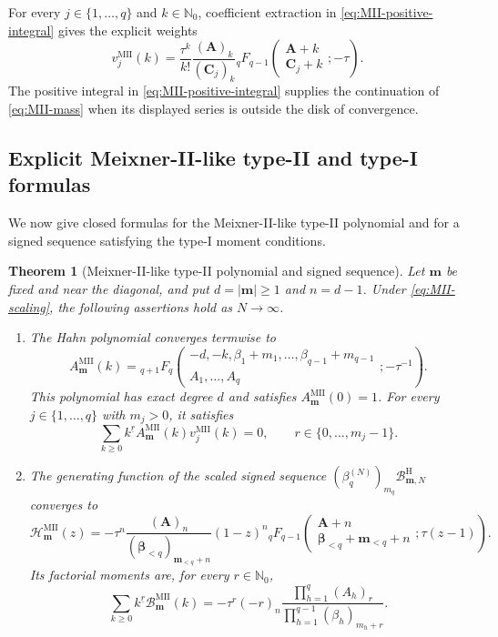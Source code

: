 \documentclass[10pt]{amsart}
\newcommand{\Nzero}{\mathbb N_0}
\newcommand{\A}{\boldsymbol A}
\newcommand{\bbeta}{\boldsymbol\beta}
\newcommand{\mm}{\boldsymbol m}
\newcommand{\abs}[1]{\lvert#1\rvert}
\newcommand{\fall}[2]{#1^{\underline{#2}}}
\newcommand{\pFq}[5]{{}_{#1}F_{#2}\!\left(\begin{matrix}#3\\#4\end{matrix};#5\right)}
\theoremstyle{plain}
\newtheorem{theorem}{Theorem}[section]
\theoremstyle{definition}
\theoremstyle{remark}
\begin{document}
For every \(j\in\{1,\ldots,q\}\) and \(k\in\Nzero\), coefficient
extraction in \eqref{eq:MII-positive-integral} gives the explicit weights
\begin{equation}
 v_j^{\mathrm{MII}}(k)
 =\frac{\tau^k}{k!}
 \frac{(\A)_k}{(\boldsymbol C_j)_k}
 \pFq{q}{q-1}{\A+k}{\boldsymbol C_j+k}{-\tau}.
 \label{eq:MII-mass}
\end{equation}
The positive integral in \eqref{eq:MII-positive-integral} supplies the
continuation of \eqref{eq:MII-mass} when its displayed series is outside
the disk of convergence.

\subsection{Explicit Meixner-II-like type-II and type-I formulas}

We now give closed formulas for the Meixner-II-like type-II polynomial and
for a signed sequence satisfying the type-I moment conditions.

\begin{theorem}[Meixner-II-like type-II polynomial and signed sequence]
\label{thm:MII-forms}
Let \(\mm\) be fixed and near the diagonal, and put
\(d=\abs\mm\ge1\) and \(n=d-1\). Under \eqref{eq:MII-scaling}, the
following assertions hold as \(N\to\infty\).
\begin{enumerate}[label=\textnormal{(\roman*)}]
\item The Hahn polynomial converges termwise to
\begin{equation}
 A_{\mm}^{\mathrm{MII}}(k)=
 \pFq{q+1}{q}
 {-d,-k,\beta_1+m_1,\ldots,\beta_{q-1}+m_{q-1}}
 {A_1,\ldots,A_q}{-\tau^{-1}}.
 \label{eq:MII-A}
\end{equation}
This polynomial has exact degree \(d\) and satisfies
\(A_{\mm}^{\mathrm{MII}}(0)=1\).
For every \(j\in\{1,\ldots,q\}\) with \(m_j>0\), it satisfies
\begin{equation}
 \sum_{k\ge0}\fall{k}{r}A_{\mm}^{\mathrm{MII}}(k)
 v_j^{\mathrm{MII}}(k)=0,
 \qquad r\in\{0,\ldots,m_j-1\}.
 \label{eq:MII-A-orthogonality}
\end{equation}

\item The generating function of the scaled signed sequence
\((\beta_q^{(N)})_{m_q}\mathcal B_{\mm,N}^{\mathrm H}\) converges to
\begin{equation}
 \mathcal H_{\mm}^{\mathrm{MII}}(z)
 =-\tau^n\frac{(\A)_n}{(\bbeta_{<q})_{\mm_{<q}+n}}(1-z)^n
 \pFq{q}{q-1}
 {\A+n}{\bbeta_{<q}+\mm_{<q}+n}{\tau(z-1)}.
 \label{eq:MII-B-pgf}
\end{equation}
Its factorial moments are, for every \(r\in\Nzero\),
\begin{equation}
 \sum_{k\ge0}\fall{k}{r}\mathcal B_{\mm}^{\mathrm{MII}}(k)
 =-\tau^r(-r)_n
 \frac{\prod_{h=1}^{q}(A_h)_r}
 {\prod_{h=1}^{q-1}(\beta_h)_{m_h+r}}.
 \label{eq:MII-B-moments}
\end{equation}
\end{enumerate}
\end{theorem}
\end{document}
